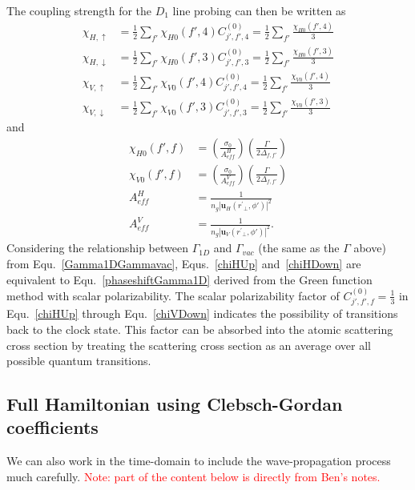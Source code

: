 The coupling strength for the $ D_1 $ line probing can then be written as
\begin{align}
\chi_{H,\uparrow} &=   \frac{1}{2} \sum_{f'} \chi_{H0}(f',4) C_{j',f',4}^{(0)}  =  \frac{1}{2} \sum_{f'} \frac{\chi_{H0}(f',4)}{3} \label{chiHUp}  \\
\chi_{H,\downarrow} &=   \frac{1}{2} \sum_{f'} \chi_{H0}(f',3)  C_{j',f',3}^{(0)} = \frac{1}{2} \sum_{f'} \frac{\chi_{H0}(f',3) }{3} \label{chiHDown}\\
\chi_{V,\uparrow} &=   \frac{1}{2} \sum_{f'} \chi_{V0}(f',4)  C_{j',f',4}^{(0)}  =   \frac{1}{2} \sum_{f'} \frac{\chi_{V0}(f',4)}{3}\label{chiVUp}  \\
\chi_{V,\downarrow} &=   \frac{1}{2} \sum_{f'} \chi_{V0}(f',3)  C_{j',f',3}^{(0)}=   \frac{1}{2} \sum_{f'} \frac{\chi_{V0}(f',3) }{3} \label{chiVDown}
\end{align}
and 
\begin{align}
\chi_{H0}(f',f) &= \left( \frac{ \sigma_0}{A_{ef\!f}^H} \right) \left( \frac{\Gamma}{2 \Delta_{f,f'}} \right)\\
\chi_{V0}(f',f) &= \left( \frac{ \sigma_0}{A_{ef\!f}^V} \right) \left( \frac{\Gamma}{2 \Delta_{f,f'}} \right)\\
A_{ef\!f}^H &= \frac{1}{n_g|\mathbf{u}_{H}(r^\prime\!\!_\perp,\phi')|^2}\\
A_{ef\!f}^V &= \frac{1}{n_g | \mathbf{u}_{V}(r^\prime\!\!_\perp,\phi')|^2}.\label{eq:AeffV}
\end{align}
Considering the relationship between $ \Gamma_{1D} $ and $ \Gamma_{vac} $ (the same as the $ \Gamma $ above) from Equ.~\eqref{Gamma1DGammavac}, Equs.~\eqref{chiHUp} and~\eqref{chiHDown} are equivalent to Equ.~\eqref{phaseshiftGamma1D} derived from the Green function method with scalar polarizability. The scalar polarizability factor of $ C_{j',f',f}^{(0)}=\frac{1}{3} $ in Equ.~\eqref{chiHUp} through Equ.~\eqref{chiVDown} indicates the possibility of transitions back to the clock state. This factor can be absorbed into the atomic scattering cross section by treating the scattering cross section as an average over all possible quantum transitions. 

\subsection{Full Hamiltonian using Clebsch-Gordan coefficients}
We can also work in the time-domain to include the wave-propagation process much carefully. \textcolor{red}{Note: part of the content below is directly from Ben's notes.}

